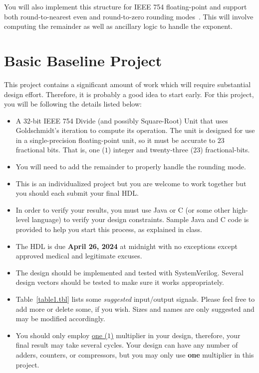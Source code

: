 \documentclass[times, 10pt, twocolumn]{IEEEtran}
\begin{document}
You will also implement this structure for IEEE 754 floating-point and
support both round-to-nearest even and round-to-zero rounding modes~\cite{30711}.
This will involve computing the remainder as well as ancillary logic
to handle the exponent.

\section{Basic Baseline Project}

This project contains a significant amount of work which will require
substantial design effort.  Therefore, it is probably a good idea to start
early.  For this project, you will be following the details listed below:
\begin{itemize}
\item A $32$-bit IEEE 754 Divide (and possibly Square-Root) Unit that uses Goldschmidt's
  iteration to compute its operation.  The unit is designed for use in
  a single-precision floating-point unit, so it must be accurate to
  $23$ fractional bits.  That is, one ($1$) integer and twenty-three
  ($23$) fractional-bits.
\item You will need to add the remainder to properly handle the
  rounding mode.  
\item This is an individualized project but you are welcome to work
  together but you should each submit your final HDL.
\item In order to verify your results, you must use Java or C (or some
  other high-level language) to
  verify your design constraints.  Sample Java and C code is provided
  to help you start this process, as explained in class.
\item The HDL is due {\bf April 26, 2024} at midnight
  with no exceptions except approved medical and legitimate excuses.
\item The design should be implemented and tested with SystemVerilog.
  Several design vectors should be tested to make sure it works appropriately.
\item Table~\ref{table1.tbl} lists some \textit{suggested}
  input/output signals.  Please feel
  free to add more or delete some, if you wish.  Sizes and names are
  only suggested and may be modified accordingly.
\item You should only employ \underline{one ($1$)} 
  multiplier in
  your design, therefore, your final result may take several cycles.
  Your design can have any number of adders, counters, or compressors,
  but you may only use {\bf one} multiplier in this project.  
\end{itemize}
\end{document}
